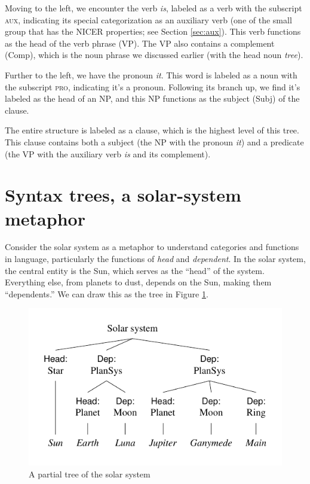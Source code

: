 Moving to the left, we encounter the verb \textit{is}, labeled as a verb with the subscript \textsc{aux}, indicating its special categorization as an auxiliary verb (one of the small group that has the NICER properties; see Section \ref{sec:aux}). This verb functions as the head of the verb phrase (VP). The VP also contains a complement (Comp), which is the noun phrase we discussed earlier (with the head noun \textit{tree}).

Further to the left, we have the pronoun \textit{it}. This word is labeled as a noun with the subscript \textsc{pro}, indicating it's a pronoun. Following its branch up, we find it's labeled as the head of an NP, and this NP functions as the subject (Subj) of the clause.

The entire structure is labeled as a clause, which is the highest level of this tree. This clause contains both a subject (the NP with the pronoun \textit{it}) and a predicate (the VP with the auxiliary verb \textit{is} and its complement).

\section{Syntax trees, a solar-system metaphor}\label{sec:trees}

Consider the solar system as a metaphor to understand categories and functions in language, particularly the functions of \textit{head} and \textit{dependent}. In the solar system, the central entity is the Sun, which serves as the ``head'' of the system. Everything else, from planets to dust, depends on the Sun, making them ``dependents.'' We can draw this as the tree in Figure \ref{fig:solarsys}.

\begin{figure}
  \centering
  \includegraphics{figures/solarsys.pdf}
  \caption{A partial tree of the solar system}
  \label{fig:solarsys}
\end{figure}

